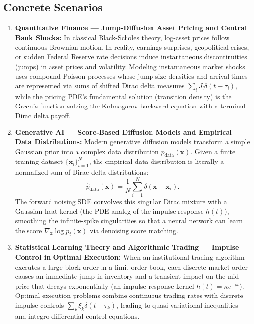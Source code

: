 \documentclass[11pt, letterpaper]{article}
\theoremstyle{definition}
\theoremstyle{remark}
\begin{document}
\subsection{Concrete Scenarios}
\begin{enumerate}
    \item \textbf{Quantitative Finance — Jump-Diffusion Asset Pricing and Central Bank Shocks:} In classical Black-Scholes theory, log-asset prices follow continuous Brownian motion. In reality, earnings surprises, geopolitical crises, or sudden Federal Reserve rate decisions induce instantaneous discontinuities (jumps) in asset prices and volatility. Modeling instantaneous market shocks uses compound Poisson processes whose jump-size densities and arrival times are represented via sums of shifted Dirac delta measures $\sum_i J_i \delta(t - \tau_i)$, while the pricing PDE's fundamental solution (transition density) is the Green's function solving the Kolmogorov backward equation with a terminal Dirac delta payoff.

    \item \textbf{Generative AI — Score-Based Diffusion Models and Empirical Data Distributions:} Modern generative diffusion models transform a simple Gaussian prior into a complex data distribution $p_{\text{data}}(\mathbf{x})$. Given a finite training dataset $\{\mathbf{x}_i\}_{i=1}^N$, the empirical data distribution is literally a normalized sum of Dirac delta distributions:
    \[
        \hat{p}_{\text{data}}(\mathbf{x}) = \frac{1}{N}\sum_{i=1}^{N} \delta(\mathbf{x} - \mathbf{x}_i).
    \]
    The forward noising SDE convolves this singular Dirac mixture with a Gaussian heat kernel (the PDE analog of the impulse response $h(t)$), smoothing the infinite-spike singularities so that a neural network can learn the score $\nabla_{\mathbf{x}} \log p_t(\mathbf{x})$ via denoising score matching.

    \item \textbf{Statistical Learning Theory and Algorithmic Trading — Impulse Control in Optimal Execution:} When an institutional trading algorithm executes a large block order in a limit order book, each discrete market order causes an immediate jump in inventory and a transient impact on the mid-price that decays exponentially (an impulse response kernel $h(t) = \kappa e^{-\rho t}$). Optimal execution problems combine continuous trading rates with discrete impulse controls $\sum_k \xi_k \delta(t - \tau_k)$, leading to quasi-variational inequalities and integro-differential control equations.
\end{enumerate}
\end{document}
